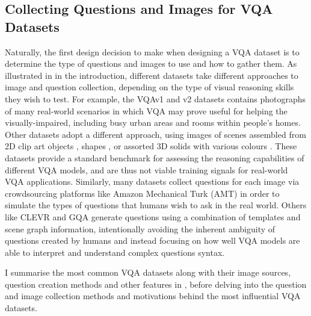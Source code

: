 \subsection{Collecting Questions and Images for VQA Datasets}
\label{subsection:question_and_image_collection}

Naturally, the first design decision to make when designing a VQA dataset is to determine the type of questions and images to use and how to gather them. As illustrated in \figureautorefname{ \ref{fig:dataset_samples}} in the introduction, different datasets take different approaches to image and question collection, depending on the type of visual reasoning skills they wish to test. For example, the VQAv1 \cite{antol2015vqa} and v2 \cite{goyal2017making} datasets contains photographs of many real-world  scenarios in which VQA may prove useful for helping the visually-impaired, including busy urban areas and rooms within people's homes. Other datasets adopt a different approach, using images of scenes assembled from 2D clip art objects \cite{zitnick2013bringing, antol2015vqa}, shapes \cite{andreas2016neural}, or assorted 3D solids with various colours \cite{johnson2017clevr}. These datasets provide a standard benchmark for assessing the reasoning capabilities of different VQA models, and are thus not viable training signals for real-world VQA applications. Similarly, many datasets collect questions for each image via crowdsourcing platforms like Amazon Mechanical Turk (AMT) in order to simulate the types of questions that humans wish to ask in the real world. Others like CLEVR \cite{johnson2017clevr} and GQA \cite{hudson2019gqa} generate questions using a combination of templates and scene graph information, intentionally avoiding the inherent ambiguity of questions created by humans and instead focusing on how well VQA models are able to interpret and understand complex questions syntax.

I summarise the most common VQA datasets along with their image sources, question creation methods and other features in \tableautorefname{ \ref{tab:dataset_comparison}}, before delving into the question and image collection methods and motivations behind the most influential VQA datasets.



